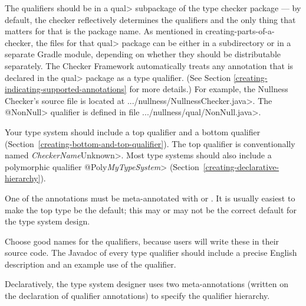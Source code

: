 The qualifiers should be in a \<qual> subpackage of the type checker package ---
by default, the checker reflectively determines the qualifiers and the only thing that matters for that is the package name.
As mentioned in {creating-parts-of-a-checker}, the files for that \<qual> package can be
either in a subdirectory or in a separate Gradle module, depending on whether
they should be distributable separately.
The Checker Framework automatically treats any annotation that
is declared in the \<qual> package as a type qualifier.
(See Section \ref{creating-indicating-supported-annotations} for more details.)
For example, the Nullness Checker's source file is located at
\<.../nullness/NullnessChecker.java>. The \<@NonNull> qualifier is defined in
file \<.../nullness/qual/NonNull.java>.


Your type system should include a top qualifier and a bottom qualifier
(Section~\ref{creating-bottom-and-top-qualifier}).
The top qualifier is conventionally named \<\emph{CheckerName}Unknown>.
Most type systems should also include a
polymorphic qualifier \<@Poly\emph{MyTypeSystem}>
(Section~\ref{creating-declarative-hierarchy}).

One of the annotations must be meta-annotated with
 or
.
It is usually easiest to make the top type be the default; this may or may
not be the correct default for the type system design.

Choose good names for the qualifiers, because users will write these in
their source code.
The Javadoc of every type qualifier should include a precise English
description and an example use of the qualifier.



Declaratively, the type system designer uses two meta-annotations (written
on the declaration of qualifier annotations) to specify the qualifier
hierarchy.

